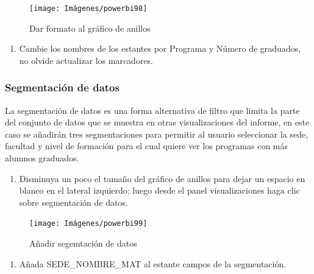 \documentclass[
]{book}
\providecommand{\tightlist}{%
  \setlength{\itemsep}{0pt}\setlength{\parskip}{0pt}}
\begin{document}
\begin{figure}

{\centering \texttt{[image: Imágenes/powerbi98]} 

}

\caption{Dar formato al gráfico de anillos}\label{fig:paso4anillos-fig}
\end{figure}

\begin{enumerate}
\def\labelenumi{\arabic{enumi}.}
\setcounter{enumi}{4}
\tightlist
\item
  Cambie los nombres de los estantes por Programa y Número de graduados, no olvide actualizar los marcadores.
\end{enumerate}

\hypertarget{segementaciondatospowerbi}{%
\subsubsection{Segmentación de datos}\label{segementaciondatospowerbi}}

La segmentación de datos es una forma alternativa de filtro que limita la parte del conjunto de datos que se muestra en otras visualizaciones del informe, en este caso se añadirán tres segmentaciones para permitir al usuario seleccionar la sede, facultad y nivel de formación para el cual quiere ver los programas con más alumnos graduados.

\begin{enumerate}
\def\labelenumi{\arabic{enumi}.}
\tightlist
\item
  Disminuya un poco el tamaño del gráfico de anillos para dejar un espacio en blanco en el lateral izquierdo; luego desde el panel visualizaciones haga clic sobre segmentación de datos.
\end{enumerate}

\begin{figure}

{\centering \texttt{[image: Imágenes/powerbi99]} 

}

\caption{Añadir segemtación de datos}\label{fig:paso1segmentacion-fig}
\end{figure}

\begin{enumerate}
\def\labelenumi{\arabic{enumi}.}
\setcounter{enumi}{1}
\tightlist
\item
  Añada SEDE\_NOMBRE\_MAT al estante campos de la segmentación.
\end{enumerate}
\end{document}
